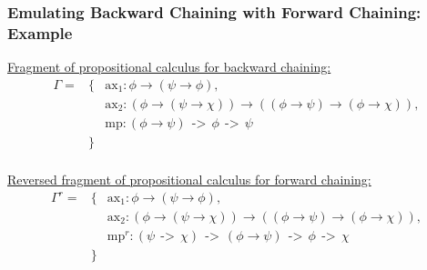 \documentclass[aspectratio=169]{beamer}
\newcommand{\arrowtype}{\ \ \text{->}\ \ }
\newcommand{\axon}{\text{ax}_1}
\newcommand{\axtw}{\text{ax}_2}
\newcommand{\axmp}{\text{mp}}
\newcommand{\axmpi}{\text{mp}^r}
\newcommand{\idiot}{I}
\newcommand{\av}{\phi}
\newcommand{\bv}{\psi}
\newcommand{\cv}{\chi}
\begin{document}
\begin{frame}
  \frametitle{Emulating Backward Chaining with Forward Chaining:
    Example}
  {\small
  \underline{Fragment of propositional calculus for backward chaining:}
  \begin{eqnarray*}
    \Gamma = &\{& \axon : \phi \to (\psi \to \phi), \\
             & & \axtw : ( \phi \to ( \psi \to \chi ) ) \to ( ( \phi
                 \to \psi ) \to ( \phi \to \chi ) ), \\
             & & \axmp : ( \phi \to \psi ) \arrowtype \phi \arrowtype
                 \psi \\
             &\}& \\
  \end{eqnarray*}

  \underline{Reversed fragment of propositional calculus for forward chaining:}
  \begin{eqnarray*}
    \Gamma^r = &\{& \axon : \phi \to (\psi \to \phi), \\
               & & \axtw : ( \phi \to ( \psi \to \chi ) ) \to ( ( \phi
                   \to \psi ) \to ( \phi \to \chi ) ), \\
               & & \axmpi : (\bv \arrowtype \cv) \arrowtype (\av \to \bv) \arrowtype \av \arrowtype \cv \\
               &\}& \\
  \end{eqnarray*}
  }
\end{frame}
\end{document}
